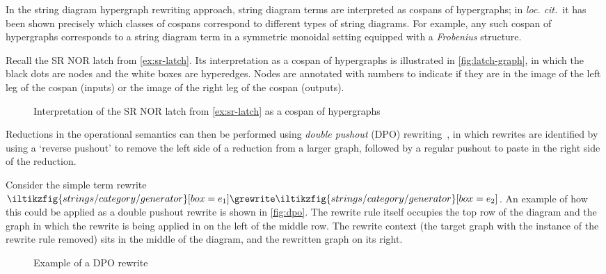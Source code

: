 \documentclass{lmcs}
\begin{document}
In the string diagram hypergraph rewriting approach, string diagram terms are
interpreted as cospans of hypergraphs; in \emph{loc. cit.}\ it has been shown
precisely which classes of cospans correspond to different types of string
diagrams.
For example, any such cospan of hypergraphs corresponds to a string diagram
term in a symmetric monoidal setting equipped with a \emph{Frobenius} structure.

\begin{exa}
    Recall the SR NOR latch from \autoref{ex:sr-latch}.
    Its interpretation as a cospan of hypergraphs is illustrated in
    \autoref{fig:latch-graph}, in which the black dots are nodes and the
    white boxes are hyperedges.
    Nodes are annotated with numbers to indicate if they are in the image of
    the left leg of the cospan (inputs) or the image of the right leg of the
    cospan (outputs).
\end{exa}

\begin{figure}
    \centering
    \caption{
        Interpretation of the SR NOR latch from \autoref{ex:sr-latch} as
        a cospan of hypergraphs
    }
    \label{fig:latch-graph}
\end{figure}

Reductions in the operational semantics can then be performed using
\emph{double pushout} (DPO) rewriting~\cite{ehrig1976parallelism}, in which
rewrites are identified by using a `reverse pushout' to remove the left side
of a reduction from a larger graph, followed by a regular pushout to paste in
the right side of the reduction.

\begin{exa}
    Consider the simple term rewrite \(
    \iltikzfig{strings/category/generator}[box=e_1]
    \grewrite
    \iltikzfig{strings/category/generator}[box=e_2]
    \).
    An example of how this could be applied as a double pushout rewrite is
    shown in \autoref{fig:dpo}.
    The rewrite rule itself occupies the top row of the diagram and the graph in
    which the rewrite is being applied in on the left of the middle row.
    The rewrite context (the target graph with the instance of the rewrite rule
    removed) sits in the middle of the diagram, and the rewritten graph on its
    right.
\end{exa}

\begin{figure}
    \center
    
    \caption{
        Example of a DPO rewrite
    }
    \label{fig:dpo}
\end{figure}
\end{document}
